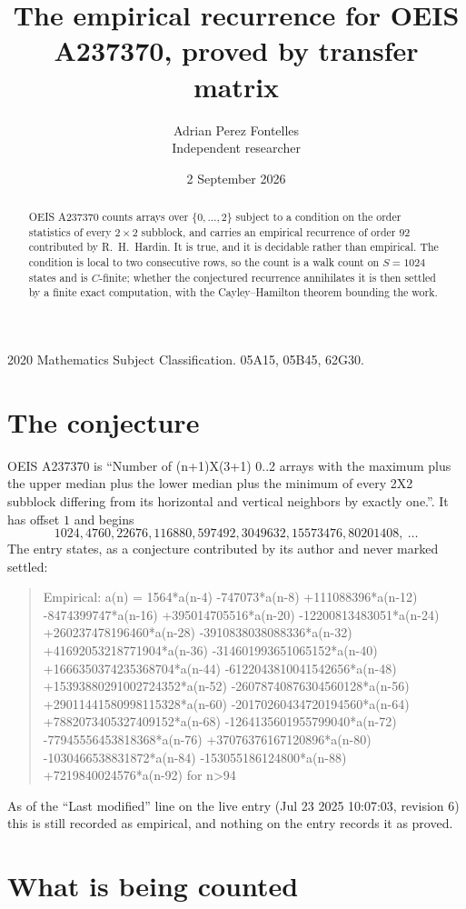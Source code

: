 \documentclass[11pt,a4paper]{article}
\title{The empirical recurrence for OEIS A237370, proved by transfer matrix}
\author{Adrian Perez Fontelles\\ \small Independent researcher}
\date{2 September 2026}
\theoremstyle{plain}
\theoremstyle{definition}
\begin{document}
\maketitle

\begin{abstract}
OEIS A237370 counts arrays over $\{0,\dots,2\}$ subject to a condition on the order
statistics of every $2\times2$ subblock, and carries an empirical recurrence of order
$92$ contributed by R.~H.~Hardin. It is true, and it is decidable rather than empirical.
The condition is local to two consecutive rows, so the count is a walk count on $S=1024$
states and is $C$-finite; whether the conjectured recurrence annihilates it is then settled by
a finite exact computation, with the Cayley--Hamilton theorem bounding the work.
\end{abstract}

\noindent\small 2020 Mathematics Subject Classification. 05A15, 05B45, 62G30.\normalsize

\section{The conjecture}

OEIS A237370 is ``Number of (n+1)X(3+1) 0..2 arrays with the maximum plus the upper median plus the lower median plus the minimum of every 2X2 subblock differing from its horizontal and vertical neighbors by exactly one.''. It has offset $1$ and begins
\[
1024, 4760, 22676, 116880, 597492, 3049632, 15573476, 80201408,\ \dots
\]
The entry states, as a conjecture contributed by its author and never marked settled:
\begin{quote}
Empirical: a(n) = 1564*a(n-4) -747073*a(n-8) +111088396*a(n-12) -8474399747*a(n-16) +395014705516*a(n-20) -12200813483051*a(n-24) +260237478196460*a(n-28) -3910838038088336*a(n-32) +41692053218771904*a(n-36) -314601993651065152*a(n-40) +1666350374235368704*a(n-44) -6122043810041542656*a(n-48) +15393880291002724352*a(n-52) -26078740876304560128*a(n-56) +29011441580998115328*a(n-60) -20170260434720194560*a(n-64) +7882073405327409152*a(n-68) -1264135601955799040*a(n-72) -77945556453818368*a(n-76) +37076376167120896*a(n-80) -1030466538831872*a(n-84) -153055186124800*a(n-88) +7219840024576*a(n-92) for n>94
\end{quote}
As of the ``Last modified'' line on the live entry (Jul 23 2025 10:07:03, revision 6) this is still
recorded as empirical, and nothing on the entry records it as proved.

\section{What is being counted}
\end{document}

